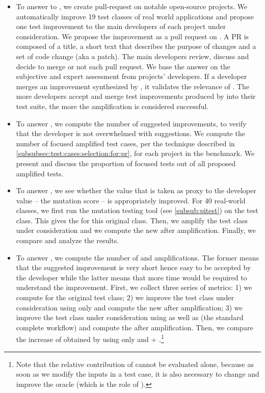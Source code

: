 \begin{itemize}
	\item \textbf{\rqpullrequest}
	To answer to \rqpullrequest, we create pull-request on notable open-source projects.
	We automatically improve 19 test classes of real world applications and propose one test improvement to the main developers of each project under consideration. We propose the improvement as a pull request on \gh. A PR is composed of a title, a short text that describes the purpose of changes and a set of code change (aka a patch).
	The main developers review, discuss and decide to merge or not each pull request.
	We base the answer on the subjective and expert assessment from projects' developers.
	If a developer merges an improvement synthesized by \dspot, it validates the relevance of \dspot.
	The more developers accept and merge test improvements produced by \dspot into their test suite, the more the amplification is considered successful.
	
	
	\item \textbf{\rqcandidates{}}
	To answer \rqcandidates{}, we compute the number of suggested improvements, to verify that the developer is not overwhelmed with suggestions.
	We compute the number of focused amplified test cases, per the technique described in \autoref{subsubsec:test:cases:selection:for:pr}, for each project in the benchmark. We present and discuss the proportion of focused tests out of all proposed amplified tests.
	
	\item \textbf{\rqeffectiveness}
	To answer \rqeffectiveness, we see whether the value that is taken as proxy to the developer value -- the mutation score -- is appropriately improved.
	For 40 real-world classes, we first run the mutation testing tool \pitest (see \autoref{subsub:pitest}) on the test class. This gives the \ams for this original class. Then, we amplify the test class under consideration and we compute the new \ams after amplification. 
	Finally, we compare and analyze the results. 
	
	
	\item \textbf{\rqAmplVersusIAmpl}
	To answer \rqAmplVersusIAmpl, we compute the number of \Aampl{} and \Iampl{} amplifications. The former means that the suggested improvement is very short hence easy to be accepted by the developer while the latter means that more time would be required to understand the improvement.
	First, we collect three series of metrics: 
	1) we compute \ams for the original test class; 
	2) we improve the test class under consideration using only \Aampl{} and compute the new \ams after amplification; 
	3) we improve the test class under consideration using \Iampl{} as well as \Aampl{} (the standard complete \dspot workflow) and compute the \ams after amplification. Then, we compare the increase of \ms obtained by using \Aampl{} only and \Iampl{} + \Aampl{}.\footnote{Note that the relative contribution of \Iampl{} cannot be evaluated alone, because as soon as we modify the inputs in a test case, it is also necessary to change and improve the oracle (which is the role of \Aampl{}).}
\end{itemize}

